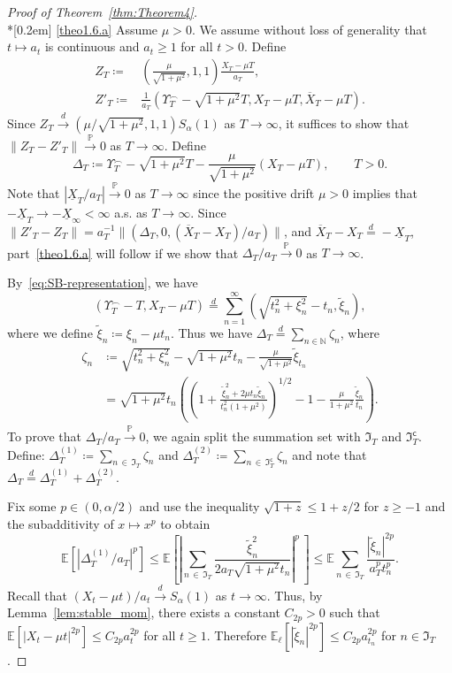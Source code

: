 \documentclass[10pt]{amsart}
\theoremstyle{definition}\newtheorem{defi}[theo]{Definition}\newtheorem{rema}[theo]{Remark}\newtheorem{exam}[theo]{Example}\newtheorem{exem}[theo]{Example}\newtheorem{nota}[theo]{Notation}
\newcommand\N{\mathbb{N}}
\newcommand\E{\mathds{E}}
\newcommand\p{\mathds{P}}
\newcommand\1{\mathds{1}}
\newcommand\GI{\mathfrak{I}}
\newcommand\co{\mathsf{c}}
\newcommand\eqd{\overset{d}{=}}
\newcommand\cid{\xrightarrow{d}}
\newcommand\cip{\xrightarrow{\p}}
\newcommand\ov[1]{\overline{#1}}
\newcommand\un[1]{\underline{#1}}
\newcommand\wt{\widetilde}
\begin{document}
\pagebreak

\begin{proof}[Proof of Theorem~\ref{thm:Theorem4}]
\ \\*[0.2em] 
\eqref{theo1.6.a} Assume $\mu >0$. We assume without loss of generality that $t\mapsto a_t$ is continuous and $a_t\ge 1$ for all $t>0$. Define
\begin{align*}
Z_T\coloneqq& \left(\frac{\mu}{\sqrt{1+\mu^2}},1,1\right)
\frac{X_T-\mu T}{a_T},
\\
 Z'_T\coloneqq& \frac{1}{a_T}
\left(\Upsilon_T^\frown -\sqrt{1+\mu^2}T,X_T-\mu T,\ov{X}_T-\mu T\right).
\end{align*}
Since $Z_T\cid(\mu/\sqrt{1+\mu^2},1,1)S_\alpha(1)$ as $T\to\infty$, it suffices to show that $\|Z_T-Z'_T\|\cip 0$ as $T \to \infty$. Define
\[
\Delta_T
\coloneqq \Upsilon_T^\frown -\sqrt{1+\mu^2}T -\frac{\mu}{\sqrt{1+\mu^2}}\left(X_T-\mu T\right),
\qquad T>0.
\]
Note that $|\un{X}_T/a_T|\cip 0$ as $T\to\infty$ since the positive drift $\mu >0$ implies that $-\un{X}_T\to-\un{X}_\infty<\infty$ a.s. as $T\to\infty$. Since $\|Z'_T-Z_T\| =a_T^{-1}\|(\Delta_T,0,(\ov{X}_T-X_T)/a_T)\|$, and $\ov{X}_T-X_T\eqd-\un{X}_T$, part~\eqref{theo1.6.a} will follow if we show that $\Delta_T/a_T\cip 0$ as $T\to\infty$.

By~\eqref{eq:SB-representation}, we have 
\[
\left(\Upsilon_T^\frown -T,X_T-\mu T\right)\eqd\sum_{n=1}^\infty\left(\sqrt{t_n^2+\xi_n^2}-t_n,\wt\xi_n\right),
\]
where we define $\wt\xi_n\coloneqq\xi_n-\mu t_n$. Thus we have $\Delta_T\eqd\sum_{n\in\N}\zeta_n$, where
\begin{align*}
\zeta_n &\coloneqq \sqrt{t_n^2+\xi_n^2} -\sqrt{1+\mu^2}t_n-\frac{\mu}{\sqrt{1+\mu^2}}\wt\xi_{t_n}\\
&=\sqrt{1+\mu^2}t_n
\left(\left(1+\frac{\wt\xi_n^2 + 2\mu t_n \wt\xi_n}{t_n^2\left(1+\mu^2\right)}\right)^{1/2}-1 -\frac{\mu}{1+\mu^2}\frac{\wt\xi_n}{t_n}\right).
\end{align*}
To prove that $\Delta_T/a_T\cip 0$, we again split the summation set with $\GI_T$ and $\GI_T^\co$. Define: $\Delta_T^{(1)}
\coloneqq \sum_{n\,\in\,\GI_T} \zeta_n$ and $\Delta_T^{(2)}
\coloneqq \sum_{n\,\in\,\GI_T^\co} \zeta_n$ and note that $\Delta_T\eqd\Delta_T^{(1)}+\Delta_T^{(2)}$.

Fix some $p\in(0,\alpha/2)$ and use the inequality $\sqrt{1+z}\le 1+z/2$ for $z\ge -1$ and the subadditivity of $x\mapsto x^p$ to obtain
\[
\E\left[\left|\Delta_T^{(1)}/a_T\right|^p\right]
\le\E\left[\left|\sum_{n\,\in\,\GI_T}
\frac{\wt\xi_n^2}{2a_T\sqrt{1+\mu^2}t_n}\right|^p\,
\right]
\le\E\sum_{n\,\in\,\GI_T}
\frac{\left|\wt\xi_n\right|^{2p}}{a_T^p t_n^p}.
\]
Recall that $(X_t-\mu t)/a_t\cid S_\alpha(1)$ as $t\to\infty$. Thus, by Lemma~\ref{lem:stable_mom}, there exists a constant $C_{2p}>0$ such that $\E[|X_t-\mu t|^{2p}]\leq C_{2p} a_t^{2p}$ for all $t\ge 1$. Therefore $\E_\ell[|\wt{\xi}_{n}|^{2p}]\le C_{2p} a_{t_n}^{2p}$ for $n\in\GI_T$.


\end{proof}
\end{document}
